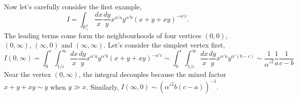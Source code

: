 \documentclass[12pt]{article}
\theoremstyle{definition}
\theoremstyle{plain}
\begin{document}
%

% 

Now let's carefully consider the first example,
\[
	I=\int_{\mathbb R_+^2} \frac{dx}{x}\frac{dy}{y}x^{\alpha' a}y^{\alpha' b}(x+y+x y)^{-\alpha' c}.
\]
The leading terms come form the neighbourhoods of four vertices $(0,0)$, $(0,\infty)$, $(\infty,0)$ and $(\infty,\infty)$. Let's consider the simplest vertex first, 
\[
	I(0,\infty)=\int_{0}^\epsilon\int_{1/\epsilon}^\infty \frac{dx}{x}\frac{dy}{y}x^{\alpha' a}y^{\alpha' b}(x+y+xy)^{-\alpha' c}\sim \int_{0}^\epsilon\int_{1/\epsilon}^\infty \frac{dx}{x}\frac{dy}{y}x^{\alpha' a}y^{\alpha' (b-c)}\sim 
	\frac{1}{{\alpha'}^2}\frac{1}{a} \frac{1}{c-b}
\]
Near the vertex $(0,\infty)$, the integral decouples because the mixed factor $x+y+xy \sim y$ when $y \gg x$.  Similarly, $I(\infty,0)\sim ({\alpha'}^2 b (c-a))^{-1}$. 
\end{document}
